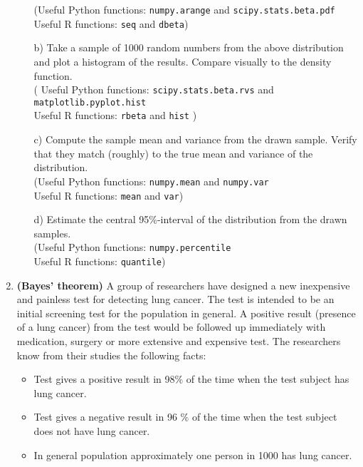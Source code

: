 \documentclass[11pt,a4paper,english]{article}
\begin{document}
\begin{enumerate}
\begin{itemize}
(Useful Python functions: {\tt numpy.arange} and {\tt scipy.stats.beta.pdf}
 \\Useful R functions: {\tt seq} and {\tt dbeta})

	\item[b)] Take a sample of 1000 random numbers from the above distribution and plot a histogram of the results. Compare visually to the density function.
	\\( Useful Python functions: {\tt scipy.stats.beta.rvs} and {\tt matplotlib.pyplot.hist}\\
	Useful R functions: {\tt rbeta} and {\tt hist} )
	\item[c)] Compute the sample mean and variance from the drawn sample. Verify that they match (roughly) to the true mean and variance of the distribution.\\
(Useful Python functions: {\tt numpy.mean} and {\tt numpy.var}\\
Useful R functions: {\tt mean} and {\tt var})
	\item[d)] Estimate the central 95\%-interval of the distribution from the drawn samples.\\
(Useful Python functions: {\tt numpy.percentile}\\ Useful R functions: {\tt quantile})
\end{itemize}



\item {\bf (Bayes' theorem)} A group of researchers have designed a new inexpensive and
  painless test for detecting lung cancer. The test is
  intended to be an initial screening test for the population in
  general. A positive result (presence of a lung cancer) from the test
  would be followed up immediately with medication, surgery or more
  extensive and expensive test. The researchers know from their
  studies the following facts:
  \begin{itemize}
  \item Test gives a positive result in 98$\%$  of the time when the
    test subject has lung cancer.
  \item Test gives a negative result in 96 $\%$ of the time when the
    test subject does not have lung cancer.
  \item In general population approximately one person in 1000 has
    lung cancer.
  \end{itemize}


\end{enumerate}
\end{document}
